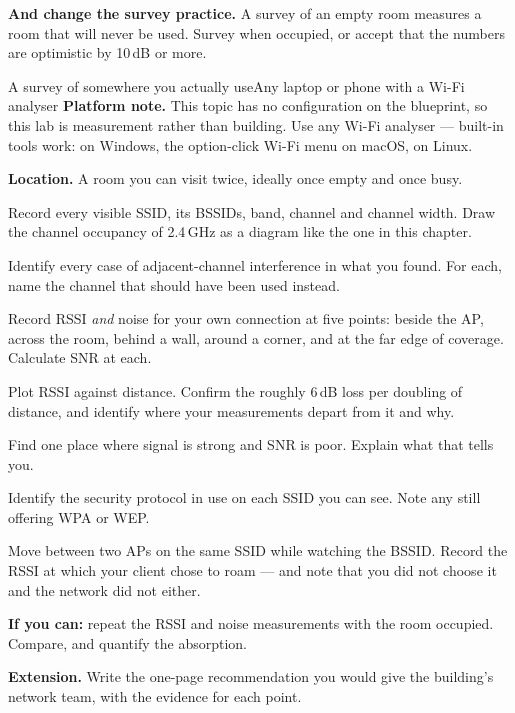 \begin{breakfix}
\textbf{And change the survey practice.} A survey of an empty room measures a room
that will never be used. Survey when occupied, or accept that the numbers are
optimistic by 10\,dB or more.
\end{breakfix}

\begin{lab}{A survey of somewhere you actually use}{Any laptop or phone with a Wi-Fi analyser}
\textbf{Platform note.} This topic has no configuration on the blueprint, so this
lab is measurement rather than building. Use any Wi-Fi analyser --- built-in
tools work:  on Windows, the option-click Wi-Fi
menu on macOS,  on Linux.

\textbf{Location.} A room you can visit twice, ideally once empty and once busy.

\begin{tasks}
  \item Record every visible SSID, its BSSIDs, band, channel and channel width.
        Draw the channel occupancy of 2.4\,GHz as a diagram like the one in this
        chapter.
  \item Identify every case of adjacent-channel interference in what you found.
        For each, name the channel that should have been used instead.
  \item Record RSSI \emph{and} noise for your own connection at five points:
        beside the AP, across the room, behind a wall, around a corner, and at
        the far edge of coverage. Calculate SNR at each.
  \item Plot RSSI against distance. Confirm the roughly 6\,dB loss per doubling
        of distance, and identify where your measurements depart from it and why.
  \item Find one place where signal is strong and SNR is poor. Explain what that
        tells you.
  \item Identify the security protocol in use on each SSID you can see. Note any
        still offering WPA or WEP.
  \item Move between two APs on the same SSID while watching the BSSID. Record
        the RSSI at which your client chose to roam --- and note that you did not
        choose it and the network did not either.
  \item \textbf{If you can:} repeat the RSSI and noise measurements with the room
        occupied. Compare, and quantify the absorption.
  \item \textbf{Extension.} Write the one-page recommendation you would give the
        building's network team, with the evidence for each point.
\end{tasks}
\end{lab}

